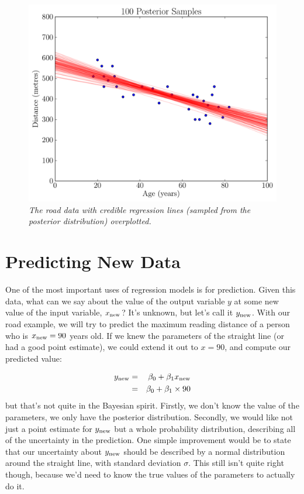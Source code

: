 \begin{figure}[ht!]
\begin{center}
\includegraphics[scale=0.5]{Figures/road_lines.pdf}
\caption{\it The road data with credible regression lines (sampled from the
posterior distribution) overplotted.\label{fig:road_lines}}
\end{center}
\end{figure}

\section{Predicting New Data}
One of the most important uses of regression models is for prediction. Given
this data, what can we say about the value of the output variable $y$ at some
new value of the input variable, $x_{\rm new}$? It's unknown, but let's call it
$y_{\rm new}$. With our road example, we will try to predict the maximum reading
distance of a person who is $x_{\rm new}=90$ years old.
If we knew the parameters of the straight line (or had a good point estimate),
we could extend it out to $x=90$, and compute our predicted value:

\begin{eqnarray}
y_{\rm new} &=& \beta_0 + \beta_1 x_{\rm new}\\
&=& \beta_0 + \beta_1\times 90
\end{eqnarray}
but that's not quite in the Bayesian spirit. Firstly, we don't know the value
of the parameters, we only have the posterior distribution. Secondly, we would
like not just a point estimate for $y_{\rm new}$ but a whole probability distribution,
describing all of the uncertainty in the prediction. One simple improvement
would be to state that our uncertainty about $y_{\rm new}$ should be described
by a normal distribution around the straight line, with standard deviation $\sigma$.
This still isn't quite right though, because we'd need to know the true values
of the parameters to actually do it.

